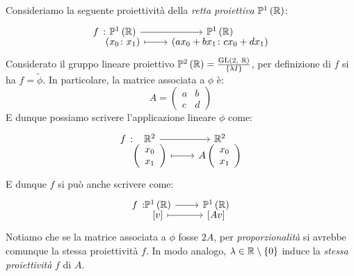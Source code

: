 \begin{example}
	Consideriamo la seguente proiettività della \textit{retta proiettiva} $\proj[1]{\realset}$:
	\begin{equation*}
		\funztot{f}{\proj[1]{\realset}}{\proj[1]{\realset}}{\left(x_0\colon x_1\right)}{\left(ax_0+bx_1\colon cx_0+dx_1\right)}
	\end{equation*}
	Considerato il gruppo lineare proiettivo $\proj[2]{\realset}=\frac{\gl\left(2,\ \realset\right)}{\left\{\lambda I\right\}}$, per definizione di $f$ si ha $f=\widetilde{\phi}$. In particolare, la matrice associata a $\phi$ è:
	\begin{equation*}
		A=\left(\begin{array}{cc}
			a & b\\
			c & d
		\end{array}\right)
	\end{equation*}
	E dunque possiamo scrivere l'applicazione lineare $\phi$ come:
	\begin{equation*}
		\funztot{f}{\realset^2}{\realset^2}{\left(\begin{array}{c}
				x_0 \\
				x_1
			\end{array}\right)}{A\left(\begin{array}{c}
				x_0 \\
				x_1
			\end{array}\right)}
	\end{equation*}
	E dunque $f$ si può anche scrivere come:
	\begin{equation*}
		\funztot{f}{\proj[1]{\realset}}{\proj[1]{\realset}}{\left[v\right]}{\left[Av\right]}
	\end{equation*}
	Notiamo che se la matrice associata a $\phi$ fosse $2A$, per \textit{proporzionalità} si avrebbe comunque la stessa proiettività $f$. In modo analogo, $\lambda\in\mathbb{R}\setminus\left\{0\right\}$ induce la \textit{stessa proiettività} $f$ di $A$.
\end{example}
